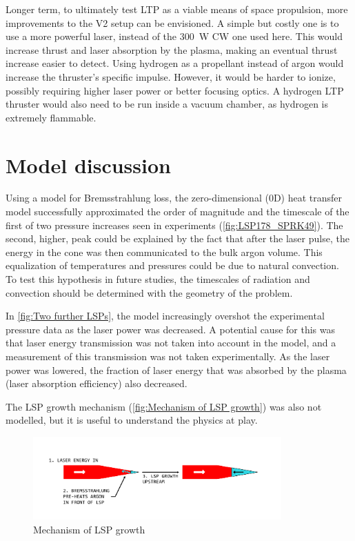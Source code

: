 Longer term, to ultimately test LTP as a viable means of space propulsion, more improvements to the V2 setup can be envisioned. A simple but costly one is to use a more powerful laser, instead of the \qty{300}{W} CW one used here. This would increase thrust and laser absorption by the plasma, making an eventual thrust increase easier to detect. Using hydrogen as a propellant instead of argon would increase the thruster's specific impulse. However, it would be harder to ionize, possibly requiring higher laser power or better focusing optics. A hydrogen LTP thruster would also need to be run inside a vacuum chamber, as hydrogen is extremely flammable.

\section{Model discussion}

    Using a model for Bremsstrahlung loss, the zero-dimensional (0D) heat transfer model successfully approximated the order of magnitude and the timescale of the first of two pressure increases seen in experiments (\autoref{fig:LSP178_SPRK49}). The second, higher, peak could be explained by the fact that after the laser pulse, the energy in the cone was then communicated to the bulk argon volume. This equalization of temperatures and pressures could be due to natural convection. To test this hypothesis in future studies, the timescales of radiation and convection should be determined with the geometry of the problem.

    In \autoref{fig:Two further LSPs}, the model increasingly overshot the experimental pressure data as the laser power was decreased. A potential cause for this was that laser energy transmission was not taken into account in the model, and a measurement of this transmission was not taken experimentally. As the laser power was lowered, the fraction of laser energy that was absorbed by the plasma (laser absorption efficiency) also decreased.
    
    The LSP growth mechanism (\autoref{fig:Mechanism of LSP growth}) was also not modelled, but it is useful to understand the physics at play.

    \begin{figure}[!ht]
        \centering
        \includegraphics[width=0.85\textwidth]{assets/2 models/Mechanism of LSP growth.pdf}
        \caption{Mechanism of LSP growth}
        \label{fig:Mechanism of LSP growth}
    \end{figure}

